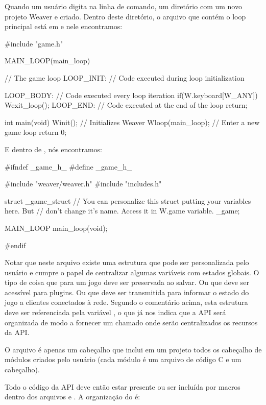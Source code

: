 
Quando um usuário digita  na linha de
comando, um diretório com um novo projeto Weaver e criado. Dentro
deste diretório, o arquivo que contém o loop principal está
em  e nele encontramos:

\alinhaverbatim
#include "game.h"

MAIN_LOOP(main_loop){ // The game loop
 LOOP_INIT: // Code executed during loop initialization

 LOOP_BODY: // Code executed every loop iteration
    if(W.keyboard[W_ANY])
        Wexit_loop();
 LOOP_END: // Code executed at the end of the loop
    return;
}

int main(void){
  Winit(); // Initializes Weaver
  Wloop(main_loop); // Enter a new game loop
  return 0;
}
\alinhanormal

E dentro de , nós encontramos:

\alinhaverbatim
#ifndef _game_h_
#define _game_h_

#include "weaver/weaver.h"
#include "includes.h"

struct _game_struct{
  // You can personalize this struct putting your variables here. But
  // don't change it's name. Access it in W.game variable.
} _game;

MAIN_LOOP main_loop(void);

#endif
\alinhanormal

Notar que neste arquivo existe uma estrutura que pode ser
personalizada pelo usuário e cumpre o papel de centralizar algumas
variáveis com estados globais. O tipo de coisa que para um jogo deve
ser preservada ao salvar. Ou que deve ser acessível para plugins. Ou
que deve ser transmitida para informar o estado do jogo a clientes
conectados à rede. Segundo o comentário acima, esta estrutura deve ser
referenciada pela variável , o que já nos indica
que a API será organizada de modo a fornecer um 
chamado  onde serão centralizados os recursos da API.

O arquivo  é apenas um cabeçalho que inclui em
um projeto todos os cabeçalho de módulos criados pelo usuário (cada
módulo é um arquivo de código C e um cabeçalho).

Todo o código da API deve então estar presente ou ser incluída por
macros dentro dos arquivos 
e . A organização do  é:

